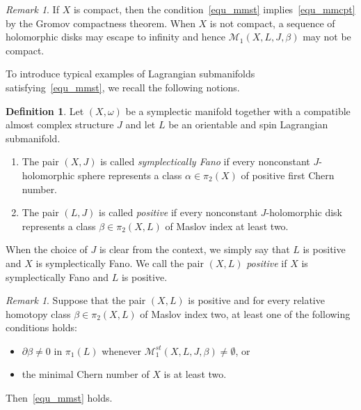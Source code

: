 \documentclass[11pt]{amsart}
\theoremstyle{plain}
\theoremstyle{definition}
\newtheorem{definition}[theorem]{Definition}
\theoremstyle{remark}
\newtheorem{remark}[theorem]{Remark}
\numberwithin{equation}{section} \numberwithin{table}{section}
\numberwithin{equation}{section}
\begin{document}
\begin{remark}
If $X$ is compact, then the condition~\eqref{equ_mmst} implies~\eqref{equ_mmcpt} by the Gromov compactness theorem. When $X$ is not compact, a sequence of holomorphic disks may escape to infinity and hence $\mathcal{M}_1(X, L, J, \beta)$ may not be compact.
\end{remark}

To introduce typical examples of Lagrangian submanifolds satisfying~\eqref{equ_mmst}, we recall the following notions.

\begin{definition}\label{definition_positiveconditions}
Let $(X, \omega)$ be a symplectic manifold together with a compatible almost complex structure $J$ and let $L$ be an orientable and spin Lagrangian submanifold. 
\begin{enumerate}
\item The pair $(X, J)$ is called \emph{symplectically Fano} if every nonconstant $J$-holomorphic sphere represents a class $\alpha \in \pi_2(X)$ of positive first Chern number.
\item The pair $(L, J)$ is called \emph{positive} if every nonconstant $J$-holomorphic disk represents a class $\beta \in \pi_2(X, L)$ of Maslov index at least two. 
\end{enumerate}
When the choice of $J$ is clear from the context, we simply say that $L$ is positive and $X$ is symplectically Fano. We call the pair $(X, L)$ \emph{positive} if $X$ is symplectically Fano and $L$ is positive.
\end{definition}

\begin{remark}
Suppose that the pair $(X, L)$ is positive and for every relative homotopy class $\beta \in \pi_2(X, L)$ of Maslov index two, at least one of the following conditions holds$\colon$
\begin{itemize}
\item $\partial \beta \neq 0$ in $\pi_1(L)$ whenever $\mathcal{M}_1^{st}(X, L, J, \beta) \neq \emptyset$, or
\item the minimal Chern number of $X$ is at least two.
\end{itemize}
Then~\eqref{equ_mmst} holds. 
\end{remark}
\end{document}
